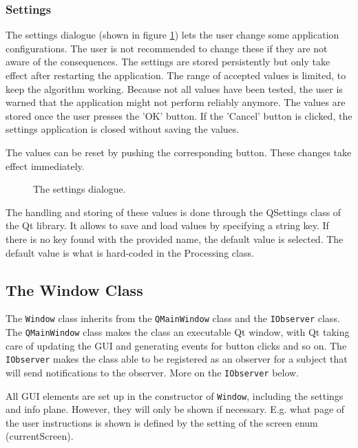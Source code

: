 \subsubsection{Settings}
The settings dialogue (shown in figure \ref{fig:UIsettings}) lets the user change some application configurations. The user is not recommended to change these if they are not aware of the consequences. The settings are stored persistently but only take effect after restarting the application. The range of accepted values is limited, to keep the algorithm working. Because not all values have been tested, the user is warned that the application might not perform reliably anymore. The values are stored once the user presses the 'OK' button. If the 'Cancel' button is clicked, the settings application is closed without saving the values.

The values can be reset by pushing the corresponding button. These changes take effect immediately. 

\begin{figure}[ht]
\centering
\caption{The settings dialogue.}
\label{fig:UIsettings}
\end{figure}

The handling and storing of these values is done through the QSettings class of the Qt library. It allows to save and load values by specifying a string key. If there is no key found with the provided name, the default value is selected. The default value is what is hard-coded in the Processing class.

\subsection{The Window Class}
The \texttt{Window} class inherits from the \texttt{QMainWindow} class and the \texttt{IObserver} class. The \texttt{QMainWindow} class makes the class an executable Qt window, with Qt taking care of updating the GUI and generating events for button clicks and so on. The \texttt{IObserver} makes the class able to be registered as an observer for a subject that will send notifications to the observer. More on the \texttt{IObserver} below.

All GUI elements are set up in the constructor of  \texttt{Window}, including the settings and info plane. However, they will only be shown if necessary. E.g. what page of the user instructions is shown is defined by the setting of the screen enum (currentScreen).

